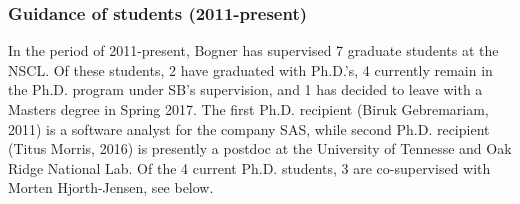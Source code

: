 

\subsubsection{Guidance of students (2011-present)}

In the period of 2011-present, Bogner has supervised 7 graduate students at the NSCL. Of
these students, 2 have graduated with Ph.D.'s, 4
currently remain in the Ph.D. program under SB's supervision, and 1 has 
decided to leave with a Masters degree in Spring 2017.  The first
Ph.D. recipient (Biruk Gebremariam, 2011) is a software analyst for the
company SAS, while second Ph.D. recipient (Titus Morris, 2016) is presently
a postdoc at the University of Tennesse and Oak Ridge National Lab. Of the
4 current Ph.D. students, 3 are co-supervised with Morten Hjorth-Jensen,
see below.
 

